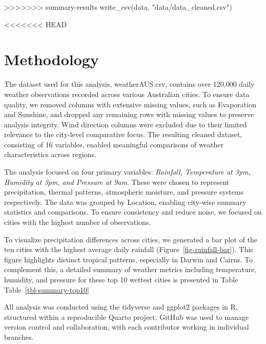 \documentclass[
  letterpaper,
  DIV=11,
  numbers=noendperiod]{scrartcl}
\newenvironment{Shaded}{\begin{snugshade}}{\end{snugshade}}
\newcommand{\FunctionTok}[1]{\textcolor[rgb]{0.28,0.35,0.67}{#1}}
\newcommand{\NormalTok}[1]{\textcolor[rgb]{0.00,0.23,0.31}{#1}}
\newcommand{\StringTok}[1]{\textcolor[rgb]{0.13,0.47,0.30}{#1}}
\begin{document}
\begin{Shaded}
\begin{Highlighting}[]
\begin{Shaded}
\begin{Highlighting}[]
\begin{Shaded}
\begin{Highlighting}[]
\begin{Shaded}
\begin{Highlighting}[]
>>>>>>> summary-results
\FunctionTok{write\_csv}\NormalTok{(data, }\StringTok{"data/data\_cleaned.csv"}\NormalTok{)}
\end{Highlighting}
\end{Shaded}

<<<<<<< HEAD
\section{Methodology}\label{methodology}

The dataset used for this analysis, weatherAUS.csv, contains over
120,000 daily weather observations recorded across various Australian
cities. To ensure data quality, we removed columns with extensive
missing values, such as Evaporation and Sunshine, and dropped any
remaining rows with missing values to preserve analysis integrity. Wind
direction columns were excluded due to their limited relevance to the
city-level comparative focus. The resulting cleaned dataset, consisting
of 16 variables, enabled meaningful comparisons of weather
characteristics across regions.

The analysis focused on four primary variables: \emph{Rainfall,
Temperature at 3pm, Humidity at 3pm, and Pressure at 9am}. These were
chosen to represent precipitation, thermal patterns, atmospheric
moisture, and pressure systems respectively. The data was grouped by
Location, enabling city-wise summary statistics and comparisons. To
ensure consistency and reduce noise, we focused on cities with the
highest number of observations.

To visualize precipitation differences across cities, we generated a bar
plot of the ten cities with the highest average daily rainfall
(Figure~\ref{fig-rainfall-bar}). This figure highlights distinct
tropical patterns, especially in Darwin and Cairns. To complement this,
a detailed summary of weather metrics including temperature, humidity,
and pressure for these top 10 wettest cities is presented in Table
Table~\ref{tbl-summary-top10}

All analysis was conducted using the tidyverse and ggplot2 packages in
R, structured within a reproducible Quarto project. GitHub was used to
manage version control and collaboration, with each contributor working
in individual branches.


\end{Highlighting}
\end{Shaded}
\end{Highlighting}
\end{Shaded}
\end{Highlighting}
\end{Shaded}
\end{document}
